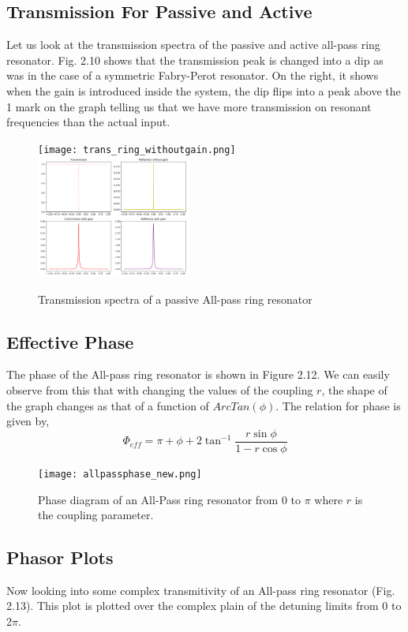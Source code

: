 \subsection{Transmission For Passive and Active}
Let us look at the transmission spectra of the passive and active all-pass ring resonator. Fig. 2.10 shows that the transmission peak is changed into a dip as was in the case of a symmetric Fabry-Perot resonator. On the right, it shows when the gain is introduced inside the system, the dip flips into a peak above the 1 mark on the graph telling us that we have more transmission on resonant frequencies than the actual input.
\begin{figure}[h]
\texttt{[image: trans\_ring\_withoutgain.png]}
\includegraphics[width=0.45\textwidth]{all-pall_gain.png}
\caption{Transmission spectra of a passive All-pass ring resonator}
\end{figure}


\subsection{Effective Phase}
The phase of the All-pass ring resonator is shown in Figure 2.12. We can easily observe from this that with changing the values of the coupling $r$, the shape of the graph changes as that of a function of $ArcTan(\phi)$. The relation for phase is given by,
\begin{equation}
\Phi_{eff} = \pi + \phi + 2\tan^{-1}\frac{r\sin\phi}{1-r\cos\phi}
\end{equation}

\begin{figure}[h]
\centering
\texttt{[image: allpassphase\_new.png]}
\caption{Phase diagram of an All-Pass ring resonator from 0 to $\pi$ where $r$ is the coupling parameter.}
\end{figure}

\subsection{Phasor Plots}
Now looking into some complex transmitivity of an All-pass ring resonator (Fig. 2.13). This plot is plotted over the complex plain of the detuning limits from 0 to 2$\pi$. 

